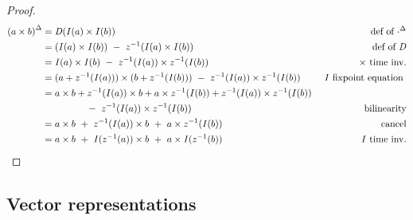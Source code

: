 \begin{proof}
$$
\begin{aligned}
{(a \times b)}^{\Delta} &= \mathit{D}(\mathit{I}(a) \times \mathit{I}(b)) & \mbox{def of } {\cdot}^{\Delta} \\
             &= (\mathit{I}(a) \times \mathit{I}(b)) ~-~  z^{-1}(\mathit{I}(a) \times \mathit{I}(b)) & \mbox{def of } \mathit{D} \\
             &= \mathit{I}(a) \times \mathit{I}(b) ~-~  z^{-1}(\mathit{I}(a)) \times z^{-1}(\mathit{I}(b)) & \times \mbox{ time inv.}\\
             &= (a + z^{-1}(\mathit{I}(a))) \times (b + z^{-1}(\mathit{I}(b))) ~-~ z^{-1}(\mathit{I}(a)) \times z^{-1}(\mathit{I}(b)) & \mbox { $\mathit{I}$ fixpoint equation } \\
             &= a \times b + z^{-1}(\mathit{I}(a)) \times b + a \times z^{-1}(\mathit{I}(b)) + z^{-1}(\mathit{I}(a)) \times z^{-1}(\mathit{I}(b)) & \\
             &  ~~~~~~~~~~~~~~-~ z^{-1}(\mathit{I}(a)) \times z^{-1}(\mathit{I}(b)) & \mbox{bilinearity} \\
             &= a \times b ~+~ z^{-1}(\mathit{I}(a)) \times b ~+~ a \times z^{-1}(\mathit{I}(b)) & \mbox{cancel} \\
             &= a \times b ~+~ \mathit{I}(z^{-1}(a)) \times b ~+~ a \times \mathit{I}(z^{-1}(b)) & \mbox{$I$ time inv.} \\
\end{aligned}
$$
\end{proof}

\subsection{Vector representations}\label{sec:vector-picture}

